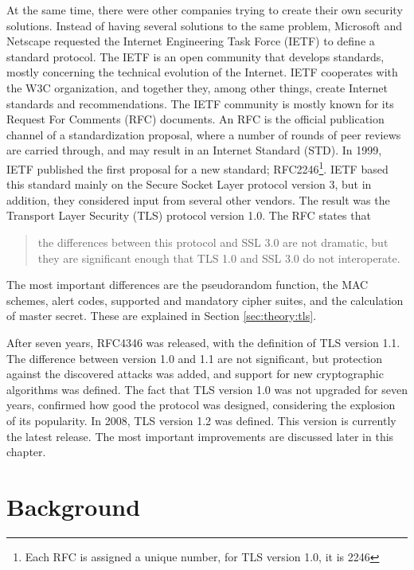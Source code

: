 \documentclass[12pt,a4paper,titlepage]{report}
\begin{document}
At the same time, there were other companies trying to create their own security solutions. Instead of having several solutions to the same problem, Microsoft and Netscape requested the Internet Engineering Task Force (IETF) to define a standard protocol. The IETF is an open community that develops standards, mostly concerning the technical evolution of the Internet. IETF cooperates with the W3C organization, and together they, among other things, create Internet standards and recommendations. The IETF community is mostly known for its Request For Comments (RFC) documents. An RFC is the official publication channel of a standardization proposal, where a number of rounds of peer reviews are carried through, and may result in an Internet Standard (STD). In 1999, IETF published the first proposal for a new standard; RFC2246\footnote{Each RFC is assigned a unique number, for TLS version 1.0, it is 2246}. IETF based this standard mainly on the Secure Socket Layer protocol version 3, but in addition, they considered input from several other vendors. The result was the Transport Layer Security (TLS) protocol version 1.0. The RFC states that 
\begin{quote}
the differences between this protocol and SSL 3.0 are not dramatic, but they are significant enough that TLS 1.0 and SSL 3.0 do not interoperate.
\end{quote}
The most important differences are the pseudorandom function, the MAC schemes, alert codes, supported and mandatory cipher suites, and the calculation of master secret. These are explained in Section \ref{sec:theory:tls}. \cite{rfc5246,sansinstitute,morrissey}

After seven years, RFC4346 was released, with the definition of TLS version 1.1. The difference between version 1.0 and 1.1 are not significant, but protection against the discovered attacks was added, and support for new cryptographic algorithms was defined. The fact that TLS version 1.0 was not upgraded for seven years, confirmed how good the protocol was designed, considering the explosion of its popularity. In 2008, TLS version 1.2 was defined. This version is currently the latest release. The most important improvements are discussed later in this chapter.\cite{berbecaru,sim97,weinstein05,rfc2246,rfc4346,rfc5246}

\newpage
\chapter{Background}
\end{document}
